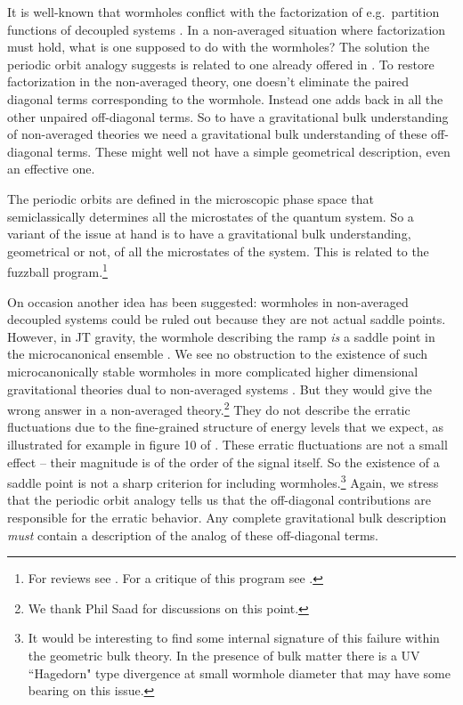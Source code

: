 \documentclass[12pt]{article}
\numberwithin{equation}{section}
\begin{document}
It is well-known that wormholes conflict with the factorization of e.g.~partition functions of decoupled systems \cite{Maldacena:2004rf}.  In a non-averaged situation where factorization must hold, what is one supposed to do with the wormholes? The solution the periodic orbit analogy suggests is related to one already offered in \cite{Maldacena:2004rf}.    To restore factorization in the non-averaged theory, one doesn't eliminate the paired diagonal terms corresponding to the wormhole.  Instead one adds back in all the other unpaired off-diagonal terms.   So to have a gravitational  bulk understanding of non-averaged theories we need a gravitational  bulk  understanding of these off-diagonal terms. These might well not have a simple geometrical description, even an effective one.   

The periodic orbits are defined in the microscopic phase space that semiclassically determines all the microstates of the quantum system.   So a variant of the issue at hand is to have a gravitational bulk understanding, geometrical or not,  of all the microstates of the system.  This is related to  the fuzzball program.\footnote{For reviews see \cite{Mathur:2008nj,Bena:2013dka}. For a critique of this program see \cite{Raju:2018xue}.}   

On occasion another idea has been suggested: wormholes in non-averaged decoupled systems could be ruled out because they are not actual saddle points. However, in JT gravity, the wormhole describing the ramp \emph{is} a saddle point in the microcanonical ensemble \cite{Saad:2018bqo,Saad:2019pqd}.  We see no obstruction to the existence of such microcanonically stable wormholes in more complicated higher dimensional gravitational theories dual to non-averaged systems \cite{Saad:2018bqo}.  But they would give the wrong answer in a non-averaged theory.\footnote{We thank Phil Saad for discussions on this point.}  They do not describe the erratic fluctuations due to the fine-grained structure of energy levels  that we expect, as illustrated for example in figure 10 of \cite{Cotler:2016fpe}.  These erratic fluctuations are not a small effect -- their magnitude is of the order of the signal itself. So the existence of a saddle point is not a sharp criterion for including wormholes.\footnote{It would be interesting to find some internal signature of this failure within the geometric bulk theory.   In the presence of bulk matter there is a UV ``Hagedorn" type divergence at small wormhole diameter \cite{Saad:2019lba} that may have some bearing on this issue.}  Again, we stress that the periodic orbit analogy tells us that  the off-diagonal contributions are responsible for the erratic behavior.  Any complete gravitational bulk description \emph{must} contain a description of the analog of these  off-diagonal terms.  
\end{document}
